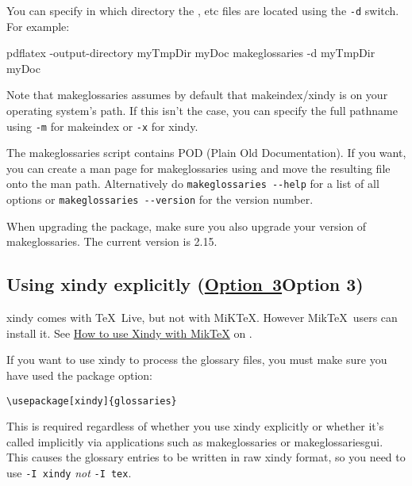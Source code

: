 \documentclass[report,inlinetitle]{nlctdoc}
\newcommand*{\opt}[1]{\hyperlink{option#1}{Option~#1}}
\begin{document}
You can specify in which directory the , 
 etc files are located using the \texttt{-d} switch.
For example:
\begin{prompt}
pdflatex -output-directory myTmpDir myDoc
makeglossaries -d myTmpDir myDoc
\end{prompt}
Note that \gls*{makeglossaries} assumes by default that
\gls*{makeindex}\slash\gls*{xindy} is on your operating system's
path. If this isn't the case, you can specify the full pathname
using \texttt{-m}  for \gls*{makeindex}
or \texttt{-x}  for \gls*{xindy}.

The \gls{makeglossaries} script contains POD (Plain Old
Documentation). If you want, you can create a man page for
\gls*{makeglossaries} using  and move the 
resulting file onto the man path. Alternatively do
\texttt{makeglossaries -{}-help} for a list of all options or
\texttt{makeglossaries -{}-version} for the version number.

\begin{important}
When upgrading the  package, make sure you also
upgrade your version of \gls{makeglossaries}. The current version is
2.15.
\end{important}

\subsection[Using xindy explicitly (Option~3)]{Using
\gls{xindy} explicitly (\ifpdf \opt3\else Option 3\fi)}
\label{sec:xindyapp}

\Gls{xindy} comes with \TeX~Live, but not with MiK\TeX. However
Mik\TeX\ users can install it. See
\href{http://tex.stackexchange.com/questions/71167/how-to-use-xindy-with-miktex}{How
to use Xindy with MikTeX} on
.

If you want to use \gls{xindy} to process the glossary
files, you must make sure you have used the 
 package option:
\begin{verbatim}
\usepackage[xindy]{glossaries}
\end{verbatim}
This is required regardless of whether you use \gls{xindy}
explicitly or whether it's called implicitly via applications such
as \gls{makeglossaries} or \gls{makeglossariesgui}. This causes the glossary 
entries to be written in raw \gls*{xindy} format, so you need to
use \texttt{-I xindy} \emph{not} \texttt{-I tex}.
\end{document}

